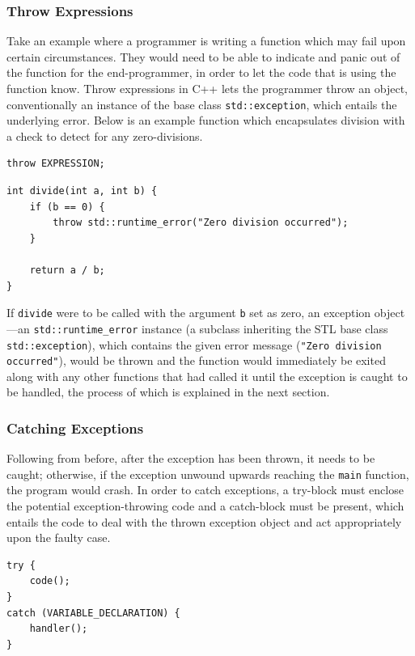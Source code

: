 \documentclass[12pt]{article}
\begin{document}
\subsubsection{Throw Expressions}
Take an example where a programmer is writing a function which may fail upon certain circumstances. They would need to be able to indicate and panic out of the function for the end-programmer, in order to let the code that is using the function know. Throw expressions in C++ lets the programmer throw an object, conventionally an instance of the base class \texttt{std::exception}, which entails the underlying error. Below is an example function which encapsulates division with a check to detect for any zero-divisions.

\begin{verbatim}
throw EXPRESSION;
\end{verbatim}

\begin{verbatim}
int divide(int a, int b) {
    if (b == 0) {
        throw std::runtime_error("Zero division occurred");
    }

    return a / b;
}
\end{verbatim}

If \texttt{divide} were to be called with the argument \texttt{b} set as zero, an exception object---an \texttt{std::runtime\_error} instance (a subclass inheriting the STL base class \texttt{std::exception}), which contains the given error message (\texttt{"Zero division occurred"}), would be thrown and the function would immediately be exited along with any other functions that had called it until the exception is caught to be handled, the process of which is explained in the next section.

\subsubsection{Catching Exceptions}
Following from before, after the exception has been thrown, it needs to be caught; otherwise, if the exception unwound upwards reaching the \texttt{main} function, the program would crash. In order to catch exceptions, a try-block must enclose the potential exception-throwing code and a catch-block must be present, which entails the code to deal with the thrown exception object and act appropriately upon the faulty case.

\begin{verbatim}
try {
    code();
}
catch (VARIABLE_DECLARATION) {
    handler();
}
\end{verbatim}
\end{document}
